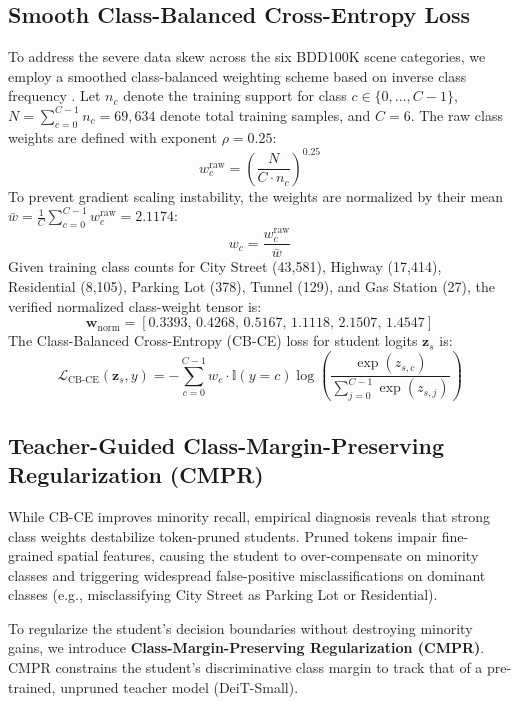 \documentclass[conference]{IEEEtran}
\begin{document}
\subsection{Smooth Class-Balanced Cross-Entropy Loss}
To address the severe data skew across the six BDD100K scene categories, we employ a smoothed class-balanced weighting scheme based on inverse class frequency \cite{cui2019class}. Let $n_c$ denote the training support for class $c \in \{0, \dots, C-1\}$, $N = \sum_{c=0}^{C-1} n_c = 69,634$ denote total training samples, and $C=6$. The raw class weights are defined with exponent $\rho = 0.25$:
\begin{equation}
w_c^{\text{raw}} = \left(\frac{N}{C \cdot n_c}\right)^{0.25}
\end{equation}
To prevent gradient scaling instability, the weights are normalized by their mean $\bar{w} = \frac{1}{C}\sum_{c=0}^{C-1} w_c^{\text{raw}} = 2.1174$:
\begin{equation}
w_c = \frac{w_c^{\text{raw}}}{\bar{w}}
\end{equation}
Given training class counts for City Street (43,581), Highway (17,414), Residential (8,105), Parking Lot (378), Tunnel (129), and Gas Station (27), the verified normalized class-weight tensor is:
\begin{equation}
\mathbf{w}_{\text{norm}} = [0.3393, \, 0.4268, \, 0.5167, \, 1.1118, \, 2.1507, \, 1.4547]
\end{equation}
The Class-Balanced Cross-Entropy (CB-CE) loss for student logits $\mathbf{z}_s$ is:
\begin{equation}
\mathcal{L}_{\text{CB-CE}}(\mathbf{z}_s, y) = - \sum_{c=0}^{C-1} w_c \cdot \mathbb{I}(y = c) \log \left(\frac{\exp(z_{s, c})}{\sum_{j=0}^{C-1} \exp(z_{s, j})}\right)
\end{equation}

\subsection{Teacher-Guided Class-Margin-Preserving Regularization (CMPR)}
While CB-CE improves minority recall, empirical diagnosis reveals that strong class weights destabilize token-pruned students. Pruned tokens impair fine-grained spatial features, causing the student to over-compensate on minority classes and triggering widespread false-positive misclassifications on dominant classes (e.g., misclassifying City Street as Parking Lot or Residential).

To regularize the student's decision boundaries without destroying minority gains, we introduce \textbf{Class-Margin-Preserving Regularization (CMPR)}. CMPR constrains the student's discriminative class margin to track that of a pre-trained, unpruned teacher model (DeiT-Small).
\end{document}
